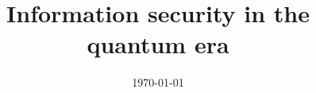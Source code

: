 \documentclass[rmp, twocolumn, nofootinbib, superscriptaddress, longbibliography, eqsecnum]{revtex4-2}
\begin{document}
\title{Information security in the quantum era}



\date{\today}

\frenchspacing



\maketitle

\tableofcontents













 \label{references}
\end{document}
